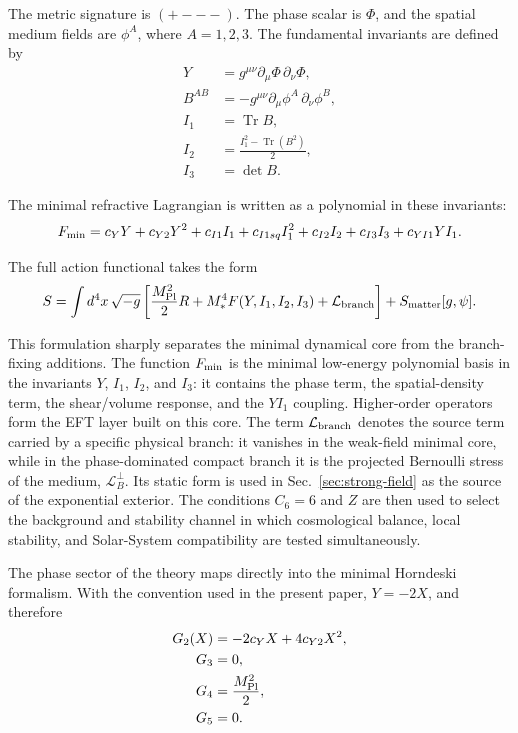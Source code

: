 \documentclass[12pt]{article}
\begin{document}
The metric signature is $(+---)$. The phase scalar is $\Phi$, and the spatial medium fields are $\phi^A$, where $A=1,2,3$. The fundamental invariants are defined by
\begin{align}
Y &= g^{\mu\nu}\partial_\mu\Phi\,\partial_\nu\Phi, \\
B^{AB} &= -g^{\mu\nu}\partial_\mu\phi^A\,\partial_\nu\phi^B, \\
I_1 &= \operatorname{Tr} B, \\
I_2 &= \frac{I_1^2-\operatorname{Tr}(B^2)}{2}, \\
I_3 &= \det B .
\end{align}

The minimal refractive Lagrangian is written as a polynomial in these invariants:
\begin{equation}
F_{\rm min}
= c_Y Y+c_{Y2}Y^2+c_{I1}I_1+c_{I1sq}I_1^2+c_{I2}I_2+c_{I3}I_3+c_{YI1}YI_1 .
\end{equation}

The full action functional takes the form
\begin{equation}
S=\int d^4x\,\sqrt{-g}
\left[
\frac{M_{\rm Pl}^2}{2}R+M_*^4F(Y,I_1,I_2,I_3)
+\mathcal L_{\rm branch}
\right]
 + S_{\rm matter}[g,\psi] .
\end{equation}

This formulation sharply separates the minimal dynamical core from the branch-fixing additions. The function $F_{\rm min}$ is the minimal low-energy polynomial basis in the invariants $Y$, $I_1$, $I_2$, and $I_3$: it contains the phase term, the spatial-density term, the shear/volume response, and the $YI_1$ coupling. Higher-order operators form the EFT layer built on this core. The term $\mathcal L_{\rm branch}$ denotes the source term carried by a specific physical branch: it vanishes in the weak-field minimal core, while in the phase-dominated compact branch it is the projected Bernoulli stress of the medium, $\mathcal L_B^\perp$. Its static form is used in Sec.~\ref{sec:strong-field} as the source of the exponential exterior. The conditions $C_6=6$ and $Z$ are then used to select the background and stability channel in which cosmological balance, local stability, and Solar-System compatibility are tested simultaneously.

The phase sector of the theory maps directly into the minimal Horndeski formalism. With the convention used in the present paper, $Y=-2X$, and therefore
\begin{align}
G_2(X) &= -2c_YX+4c_{Y2}X^2, \\
G_3 &= 0, \\
G_4 &= \frac{M_{\rm Pl}^2}{2}, \\
G_5 &= 0 .
\end{align}
\end{document}
